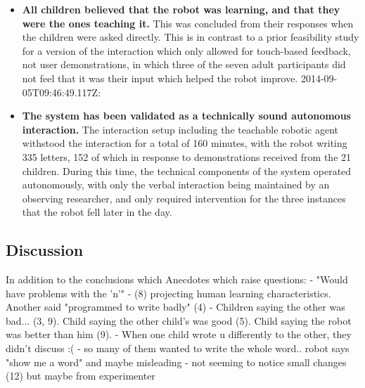 \documentclass{sig-alternate}
\begin{document}
\begin{itemize}
    \item \textbf{All children believed that the robot was learning, and that
        they were the ones teaching it.} This was concluded from their responses
        when the children were asked directly. This is in contrast to a prior
        feasibility study for a version of the interaction which only allowed
        for touch-based feedback, not user demonstrations, in which three of the
        seven adult participants did not feel that it was their input which
        helped the robot improve.%
        2014-09-05T09:46:49.117Z:



    \item \textbf{The system has been validated as a technically sound
        autonomous interaction.} The interaction setup including the teachable
        robotic agent withstood the interaction for a total of 160 minutes, with
        the robot writing 335 letters, 152 of which in response to
        demonstrations received from the 21 children. During this time, the
        technical components of the system operated autonomously, with only the
        verbal interaction being maintained by an observing researcher, and only
        required intervention for the three instances that the robot fell later
        in the day.%

\end{itemize}



\subsection{Discussion}%
%
%

In addition to the conclusions which 
Anecdotes which raise questions:
- "Would have problems with the 'n'" - (8) projecting human learning characteristics. Another said "programmed to write badly" (4)
- Children saying the other was bad... (3, 9). Child saying the other child's was good (5). Child saying the robot was better than him (9).
- When one child wrote u differently to the other, they didn't discuss :(
- so many of them wanted to write the whole word.. robot says "show me a word" and maybe misleading
- not seeming to notice small changes (12) but maybe from experimenter
\end{document}
